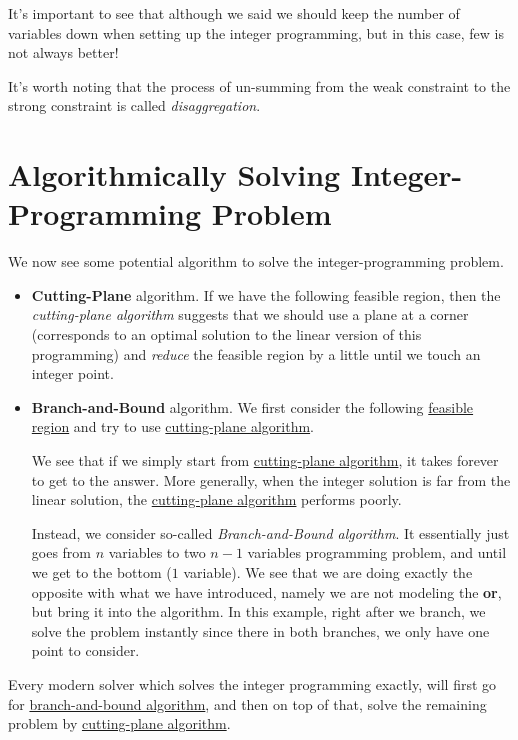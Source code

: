 \begin{remark}
	It's important to see that although we said we should keep the number of variables down when setting up the integer programming, but in this case, few is not always better!
\end{remark}

\begin{note}[Disaggregation]
	It's worth noting that the process of un-summing from the weak constraint to the strong constraint is called \emph{disaggregation}.
\end{note}

\section{Algorithmically Solving Integer-Programming Problem}
We now see some potential algorithm to solve the integer-programming problem.

\begin{itemize}
	\item \label{eg:cutting-plane}\textbf{Cutting-Plane} algorithm. If we have the following feasible region, then the \emph{cutting-plane algorithm} suggests that we should use a plane at a corner (corresponds to an optimal solution to the linear version of this programming) and \emph{reduce} the feasible region by a little until we touch an integer point.
	      \begin{center}
	      \end{center}
	\item \label{eg:branch-and-bound}\textbf{Branch-and-Bound} algorithm. We first consider the following \hyperref[def:feasible-region]{feasible region} and try to use \hyperref[eg:cutting-plane]{cutting-plane algorithm}.
	      \begin{center}
	      \end{center}
	      We see that if we simply start from \hyperref[eg:cutting-plane]{cutting-plane algorithm}, it takes forever to get to the answer. More generally, when the integer solution is far from the linear solution, the \hyperref[eg:cutting-plane]{cutting-plane algorithm} performs poorly.

	      Instead, we consider so-called \emph{Branch-and-Bound algorithm}. It essentially just goes from \(n\) variables to two \(n-1\) variables programming problem, and until we get to the bottom (\(1\) variable). We see that we are doing exactly the opposite with what we have introduced, namely we are not modeling the \textbf{or}, but bring it into the algorithm. In this example, right after we branch, we solve the problem instantly since there in both branches, we only have one point to consider.
\end{itemize}

\begin{note}
	Every modern solver which solves the integer programming exactly, will first go for \hyperref[eg:branch-and-bound]{branch-and-bound algorithm}, and then on top of that, solve the remaining problem by \hyperref[eg:cutting-plane]{cutting-plane algorithm}.
\end{note}